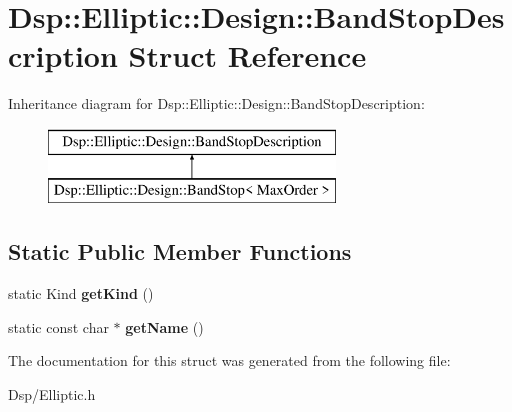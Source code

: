 \hypertarget{structDsp_1_1Elliptic_1_1Design_1_1BandStopDescription}{\section{Dsp\-:\-:Elliptic\-:\-:Design\-:\-:Band\-Stop\-Description Struct Reference}
\label{structDsp_1_1Elliptic_1_1Design_1_1BandStopDescription}
}
Inheritance diagram for Dsp\-:\-:Elliptic\-:\-:Design\-:\-:Band\-Stop\-Description\-:\begin{figure}[H]
\begin{center}
\leavevmode
\includegraphics[height=2.000000cm]{structDsp_1_1Elliptic_1_1Design_1_1BandStopDescription}
\end{center}
\end{figure}
\subsection*{Static Public Member Functions}
\begin{DoxyCompactItemize}
\item 
\hypertarget{structDsp_1_1Elliptic_1_1Design_1_1BandStopDescription_a959bfd13dd8c74ac19984d119c611d3f}{static Kind {\bfseries get\-Kind} ()}\label{structDsp_1_1Elliptic_1_1Design_1_1BandStopDescription_a959bfd13dd8c74ac19984d119c611d3f}

\item 
\hypertarget{structDsp_1_1Elliptic_1_1Design_1_1BandStopDescription_aae140d42d2610ec78acba0cd37808012}{static const char $\ast$ {\bfseries get\-Name} ()}\label{structDsp_1_1Elliptic_1_1Design_1_1BandStopDescription_aae140d42d2610ec78acba0cd37808012}

\end{DoxyCompactItemize}


The documentation for this struct was generated from the following file\-:\begin{DoxyCompactItemize}
\item 
Dsp/Elliptic.\-h\end{DoxyCompactItemize}
